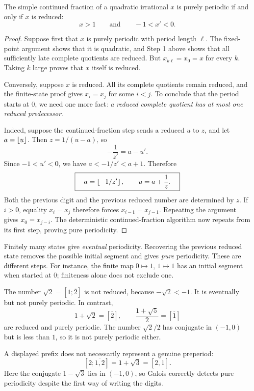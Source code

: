 \begin{theorem}
\label{thm:galois}
The simple continued fraction of a quadratic irrational $x$ is purely
periodic if and only if $x$ is reduced:
\[
 x>1\qquad\text{and}\qquad -1<x'<0.
\]
\end{theorem}
\begin{proof}
Suppose first that $x$ is purely periodic with period length $\ell$.
The fixed-point argument shows that it is quadratic, and Step 1 above
shows that all sufficiently late complete quotients are reduced.
But $x_{k\ell}=x_0=x$ for every $k$. Taking $k$ large proves that
$x$ itself is reduced.

Conversely, suppose $x$ is reduced. All its complete quotients remain
reduced, and the finite-state proof gives $x_i=x_j$ for some $i<j$.
To conclude that the period starts at $0$, we need one more fact:
\emph{a reduced complete quotient has at most one reduced predecessor}.

Indeed, suppose the continued-fraction step sends a reduced $u$ to $z$,
and let $a=\left\lfloor u\right\rfloor$. Then $z=1/(u-a)$, so
\[
 -\frac1{z'}=a-u'.
\]
Since $-1<u'<0$, we have $a<-1/z'<a+1$. Therefore
\begin{equation}\label{eq:reduced-predecessor}
 \boxed{\quad
 a=\left\lfloor -1/z'\right\rfloor,\qquad u=a+\frac1z.
 \quad}
\end{equation}
Both the previous digit and the previous reduced number are determined
by $z$. If $i>0$, equality $x_i=x_j$ therefore forces
$x_{i-1}=x_{j-1}$. Repeating the argument gives $x_0=x_{j-i}$.
The deterministic continued-fraction algorithm now repeats from its
first step, proving pure periodicity.
\end{proof}

\begin{bigidea}
Finitely many states give \emph{eventual} periodicity.
Recovering the previous reduced state removes the possible initial
segment and gives \emph{pure} periodicity. These are different steps.
For instance, the finite map $0\mapsto1$, $1\mapsto1$ has an initial
segment when started at $0$; finiteness alone does not exclude one.
\end{bigidea}

\begin{example}
The number $\sqrt2=[1;\overline2]$ is not reduced, because
$-\sqrt2<-1$. It is eventually but not purely periodic.
In contrast,
\[
 1+\sqrt2=[\overline2],
 \qquad \frac{1+\sqrt5}{2}=[\overline1]
\]
are reduced and purely periodic.
The number $\sqrt2/2$ has conjugate in $(-1,0)$ but is less than $1$,
so it is not purely periodic either.

A displayed prefix does not necessarily represent a genuine preperiod:
\[
 [2;\overline{1,2}]=1+\sqrt3=[\overline{2,1}].
\]
Here the conjugate $1-\sqrt3$ lies in $(-1,0)$, so Galois correctly
detects pure periodicity despite the first way of writing the digits.
\end{example}

